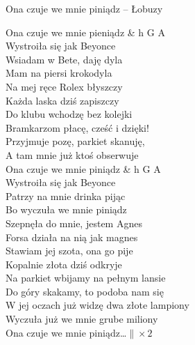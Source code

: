 \begin{piosenka}{Ona czuje we mnie piniądz -- Łobuzy}

Ona czuje we mnie pieniądz & h G A \\
Wystroiła się jak Beyonce \\[\zwrotkaspace]

Wsiadam w Bete, daję dyla \\
Mam na piersi krokodyla \\
Na mej ręce Rolex błyszczy \\
Każda laska dziś zapiszczy \\[\zwrotkaspace]

Do klubu wchodzę bez kolejki \\
Bramkarzom płacę, cześć i dzięki! \\
Przyjmuje pozę, parkiet skanuję, \\
A tam mnie już ktoś obserwuje \\[\zwrotkaspace]

 Ona czuje we mnie piniądz & h G A \\
 Wystroiła się jak Beyonce \\
 Patrzy na mnie drinka pijąc \\
 Bo wyczuła we mnie piniądz \\[\zwrotkaspace]

Szepnęła do mnie, jestem Agnes \\
Forsa działa na nią jak magnes \\
Stawiam jej szota, ona go pije \\
Kopalnie złota dziś odkryje \\[\zwrotkaspace]

Na parkiet wbijamy na pełnym lansie \\
Do góry skakamy, to podoba nam się \\
W jej oczach już widzę dwa złote lampiony \\
Wyczuła już we mnie grube miliony \\[\zwrotkaspace]

 Ona czuje we mnie piniądz\ldots $\| \times 2$ \\[\zwrotkaspace]

\end{piosenka}